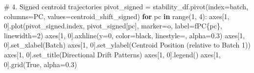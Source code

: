 \documentclass[
  letterpaper,
  DIV=11,
  numbers=noendperiod]{scrartcl}
\newenvironment{Shaded}{\begin{snugshade}}{\end{snugshade}}
\newcommand{\BuiltInTok}[1]{\textcolor[rgb]{0.00,0.23,0.31}{#1}}
\newcommand{\CommentTok}[1]{\textcolor[rgb]{0.37,0.37,0.37}{#1}}
\newcommand{\ControlFlowTok}[1]{\textcolor[rgb]{0.00,0.23,0.31}{\textbf{#1}}}
\newcommand{\DecValTok}[1]{\textcolor[rgb]{0.68,0.00,0.00}{#1}}
\newcommand{\FloatTok}[1]{\textcolor[rgb]{0.68,0.00,0.00}{#1}}
\newcommand{\KeywordTok}[1]{\textcolor[rgb]{0.00,0.23,0.31}{\textbf{#1}}}
\newcommand{\NormalTok}[1]{\textcolor[rgb]{0.00,0.23,0.31}{#1}}
\newcommand{\OperatorTok}[1]{\textcolor[rgb]{0.37,0.37,0.37}{#1}}
\newcommand{\SpecialCharTok}[1]{\textcolor[rgb]{0.37,0.37,0.37}{#1}}
\newcommand{\SpecialStringTok}[1]{\textcolor[rgb]{0.13,0.47,0.30}{#1}}
\newcommand{\StringTok}[1]{\textcolor[rgb]{0.13,0.47,0.30}{#1}}
\newcommand{\VariableTok}[1]{\textcolor[rgb]{0.07,0.07,0.07}{#1}}
\renewenvironment{Shaded}{%
  \begin{tcolorbox}[%
    enhanced,%
    colback=codebg,%
    colframe=codebg,%
    borderline west={3pt}{0pt}{sectionblue},%
    fontupper=\small\ttfamily,%
    boxrule=0pt,%
    arc=0pt,%
    boxsep=5pt,%
    left=2mm,%
    right=2mm,%
    top=2mm,%
    bottom=2mm%
  ]%
}{%
  \end{tcolorbox}%
}
\begin{document}
\begin{Shaded}
\begin{Highlighting}[]
\CommentTok{\# 4. Signed centroid trajectories}
\NormalTok{pivot\_signed }\OperatorTok{=}\NormalTok{ stability\_df.pivot(index}\OperatorTok{=}\StringTok{\textquotesingle{}batch\textquotesingle{}}\NormalTok{, columns}\OperatorTok{=}\StringTok{\textquotesingle{}PC\textquotesingle{}}\NormalTok{, values}\OperatorTok{=}\StringTok{\textquotesingle{}centroid\_shift\_signed\textquotesingle{}}\NormalTok{)}
\ControlFlowTok{for}\NormalTok{ pc }\KeywordTok{in} \BuiltInTok{range}\NormalTok{(}\DecValTok{1}\NormalTok{, }\DecValTok{4}\NormalTok{):}
\NormalTok{    axes[}\DecValTok{1}\NormalTok{, }\DecValTok{0}\NormalTok{].plot(pivot\_signed.index, pivot\_signed[pc], marker}\OperatorTok{=}\StringTok{\textquotesingle{}o\textquotesingle{}}\NormalTok{, label}\OperatorTok{=}\SpecialStringTok{f\textquotesingle{}PC}\SpecialCharTok{\{}\NormalTok{pc}\SpecialCharTok{\}}\SpecialStringTok{\textquotesingle{}}\NormalTok{, linewidth}\OperatorTok{=}\DecValTok{2}\NormalTok{)}
\NormalTok{axes[}\DecValTok{1}\NormalTok{, }\DecValTok{0}\NormalTok{].axhline(y}\OperatorTok{=}\DecValTok{0}\NormalTok{, color}\OperatorTok{=}\StringTok{\textquotesingle{}black\textquotesingle{}}\NormalTok{, linestyle}\OperatorTok{=}\StringTok{\textquotesingle{}{-}{-}\textquotesingle{}}\NormalTok{, alpha}\OperatorTok{=}\FloatTok{0.3}\NormalTok{)}
\NormalTok{axes[}\DecValTok{1}\NormalTok{, }\DecValTok{0}\NormalTok{].set\_xlabel(}\StringTok{\textquotesingle{}Batch\textquotesingle{}}\NormalTok{)}
\NormalTok{axes[}\DecValTok{1}\NormalTok{, }\DecValTok{0}\NormalTok{].set\_ylabel(}\StringTok{\textquotesingle{}Centroid Position (relative to Batch 1)\textquotesingle{}}\NormalTok{)}
\NormalTok{axes[}\DecValTok{1}\NormalTok{, }\DecValTok{0}\NormalTok{].set\_title(}\StringTok{\textquotesingle{}Directional Drift Patterns\textquotesingle{}}\NormalTok{)}
\NormalTok{axes[}\DecValTok{1}\NormalTok{, }\DecValTok{0}\NormalTok{].legend()}
\NormalTok{axes[}\DecValTok{1}\NormalTok{, }\DecValTok{0}\NormalTok{].grid(}\VariableTok{True}\NormalTok{, alpha}\OperatorTok{=}\FloatTok{0.3}\NormalTok{)}


\end{Highlighting}
\end{Shaded}
\end{document}
